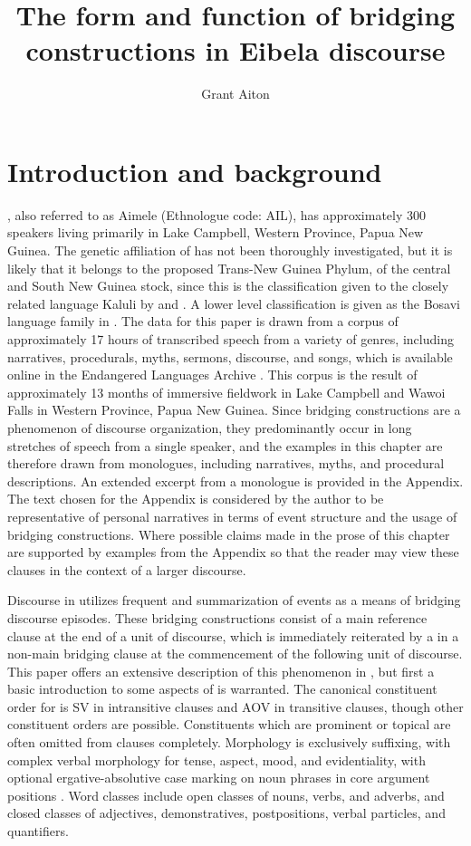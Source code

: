 \documentclass[output=paper]{LSP/langsci}
\author{
   Grant Aiton\affiliation{James Cook University}
}
\title{The form and function of bridging constructions in Eibela discourse}
\begin{document}
\label{ch:6}

\section{Introduction and background} 
\label{AiIntroduction}
, also referred to as Aimele (Ethnologue code: AIL), has approximately 300 speakers living primarily in Lake Campbell, Western Province, Papua New Guinea. The genetic affiliation of  has not been thoroughly investigated, but it is likely that it belongs to the proposed Trans-New Guinea Phylum, of the central and South New Guinea stock, since this is the classification given to the closely related language Kaluli by \citet{wurm78} and \citet{voorhoeve68}. A lower level classification is given as the Bosavi language family in \citet{shaw86}. The data for this paper is drawn from a corpus of approximately 17 hours of transcribed speech from a variety of genres, including narratives, procedurals, myths, sermons, discourse, and songs, which is available online in the Endangered Languages Archive \citep{Aiton.2016}. This corpus is the result of approximately 13 months of immersive fieldwork in Lake Campbell and Wawoi Falls in Western Province, Papua New Guinea. Since bridging constructions are a phenomenon of discourse organization, they predominantly occur in long stretches of speech from a single speaker, and the examples in this chapter are therefore drawn from monologues, including narratives, myths, and procedural descriptions. An extended excerpt from a monologue is provided in the Appendix. The text chosen for the Appendix is considered by the author to be representative of personal narratives in terms of event structure and the usage of bridging constructions. Where possible claims made in the prose of this chapter are supported by examples from the Appendix so that the reader may view these clauses in the context of a larger discourse.

Discourse in  utilizes frequent  and summarization of events as a means of bridging discourse episodes. These bridging constructions consist of a main reference clause at the end of a unit of discourse, which is immediately reiterated by a  in a non-main bridging clause at the commencement of the following unit of discourse. This paper offers an extensive description of this phenomenon in , but first a basic introduction to some aspects of  is warranted. The canonical constituent order for  is SV in intransitive clauses and AOV in transitive clauses, though other constituent orders are possible. Constituents which are prominent or topical are often omitted from clauses completely. Morphology is exclusively suffixing, with complex verbal morphology for tense, aspect, mood, and evidentiality, with optional ergative-absolutive case marking on noun phrases in core argument positions \citep[see][]{Aiton.2014}. Word classes include open classes of nouns, verbs, and adverbs, and closed classes of adjectives, demonstratives, postpositions, verbal particles, and quantifiers.
\end{document}
